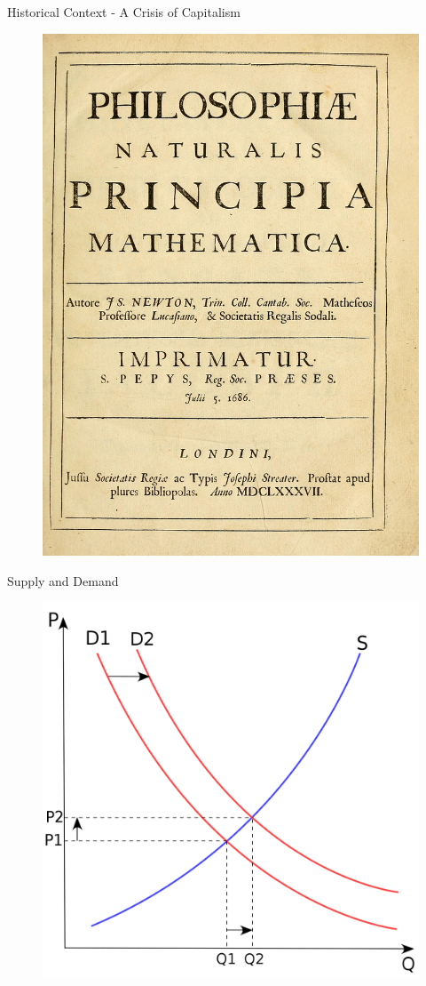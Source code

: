 \documentclass{beamer}
\begin{document}
\begin{frame}{Historical Context - A Crisis of Capitalism}

	\begin{figure}[]
		\centering
		\includegraphics[width=0.8\linewidth]{../img/Prinicipia.png}
		\label{Principia}
	\end{figure}

\end{frame}


\begin{frame}{Supply and Demand}

	\begin{figure}[htpb]
		\centering
		\includegraphics[width=0.8\linewidth]{../img/supply-and-demand.png}
	\end{figure}

\end{frame}{}
\end{document}
